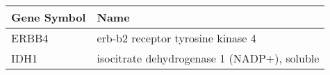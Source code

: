 \begin{tabular}{ll}
\toprule
Gene Symbol &                                        Name \\
\midrule
      ERBB4 &           erb-b2 receptor tyrosine kinase 4 \\
       IDH1 & isocitrate dehydrogenase 1 (NADP+), soluble \\
\bottomrule
\end{tabular}
